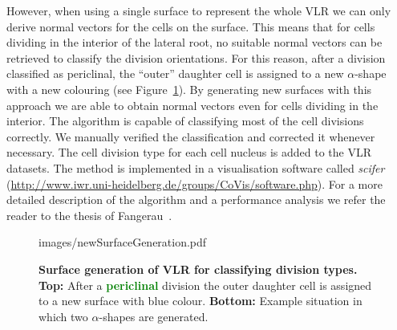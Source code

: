 \documentclass[11pt,a4paper, final]{article}
\begin{document}
However, when using a single surface to represent the whole VLR we can only derive normal vectors for the cells on the surface. This means that for cells dividing in the interior of the lateral root, no suitable normal vectors can be retrieved to classify the division orientations. For this reason, after a division classified as periclinal, the ``outer'' daughter cell is assigned to a new $\alpha$-shape with a new colouring (see Figure~\ref{fig:newSurfaceGeneration}). By generating new surfaces with this approach we are able to obtain normal vectors even for cells dividing in the interior. The algorithm is capable of classifying most of the cell divisions correctly. We manually verified the classification and corrected it whenever necessary. The cell division type for each cell nucleus is added to the VLR datasets. The method is implemented in a visualisation software called \textit{scifer} (\href{http://www.iwr.uni-heidelberg.de/groups/CoVis/software.php}{http://www.iwr.uni-heidelberg.de/groups/CoVis/software.php}). For a more detailed description of the algorithm and a performance analysis we refer the reader to the thesis of Fangerau~\cite[chapter 4]{FangerauDiss_2015}.
%
\begin{figure}[htbp]
	\begin{center}
		\begin{overpic}[width=0.9\linewidth]{images/newSurfaceGeneration.pdf}
		\end{overpic}
\caption[]
{
{\bf Surface generation of VLR for classifying division types. Top:} After a \textcolor{green}{\textbf{periclinal}} division the outer daughter cell is assigned to a new surface with blue colour. {\bf Bottom:} Example situation in which two $\alpha$-shapes are generated.
}
	\label{fig:newSurfaceGeneration}
	\end{center}
\end{figure}
%
\end{document}
